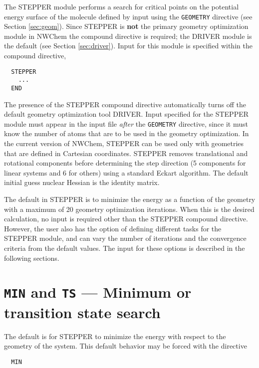 %
%

\label{sec:stepper}

The STEPPER module performs a search for critical points on the
potential energy surface of the molecule defined by input using the
\verb+GEOMETRY+ directive (see Section \ref{sec:geom}).  Since STEPPER
is {\bf not} the primary geometry optimization module in NWChem the
compound directive is required; the DRIVER module is the default (see
Section {\ref{sec:driver}}).  Input for this module is
specified within the compound directive,

\begin{verbatim}
  STEPPER
    ...
  END
\end{verbatim}

The presence of the STEPPER compound directive automatically turns off
the default geometry optimization tool DRIVER. Input specified for the
STEPPER module must appear in the input file {\em after} the
\verb+GEOMETRY+ directive, since it must know the number of atoms that
are to be used in the geometry optimization.  In the current version
of NWChem, STEPPER can be used only with geometries that are defined
in Cartesian coordinates.  STEPPER removes translational and
rotational components before determining the step direction (5
components for linear systems and 6 for others) using a standard
Eckart algorithm.  The default initial guess nuclear Hessian is the
identity matrix.

The default in STEPPER is to minimize the energy as a function of the
geometry with a maximum of 20 geometry optimization iterations.  When
this is the desired calculation, no input is required other than the
STEPPER compound directive.  However, the user also has the option of
defining different tasks for the STEPPER module, and can vary the
number of iterations and the convergence criteria from the default
values.  The input for these options is described in the following
sections.

\section{{\tt MIN} and {\tt TS} --- Minimum or transition state search}

The default is for STEPPER to minimize the energy with respect to the
geometry of the system.  This default behavior may be forced with the
directive
\begin{verbatim}
  MIN
\end{verbatim}

